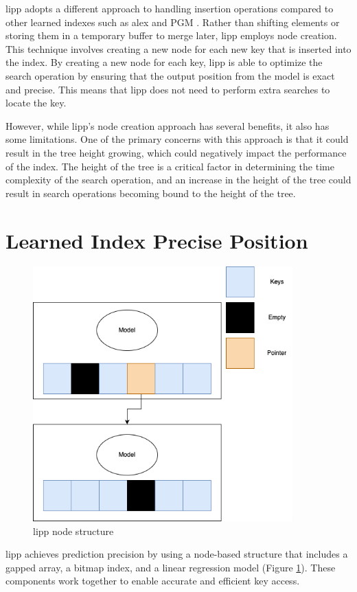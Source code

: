 \acrfull{lipp} adopts a different approach to handling insertion operations compared to other learned indexes such as \acrshort{alex} and PGM \cite{PGM}. Rather than shifting elements or storing them in a temporary buffer to merge later, \acrshort{lipp} employs node creation. This technique involves creating a new node for each new key that is inserted into the index. By creating a new node for each key, \acrshort{lipp} is able to optimize the search operation by ensuring that the output position from the model is exact and precise. This means that \acrshort{lipp} does not need to perform extra searches to locate the key.

However, while \acrshort{lipp}'s node creation approach has several benefits, it also has some limitations. One of the primary concerns with this approach is that it could result in the tree height growing, which could negatively impact the performance of the index. The height of the tree is a critical factor in determining the time complexity of the search operation, and an increase in the height of the tree could result in search operations becoming bound to the height of the tree.
\section{Learned Index Precise Position} \label{LIPP}
\begin{figure}
    \centering
    \includegraphics[width=100mm,scale=1]{Figures/LippNode.png}
    \caption{
     \acrshort{lipp} node structure
    }
    \label{fig:lipp-node}
\end{figure}
\acrshort{lipp} achieves prediction precision by using a node-based structure that includes a gapped array, a bitmap index, and a linear regression model (Figure \ref{fig:lipp-node}). These components work together to enable accurate and efficient key access.

